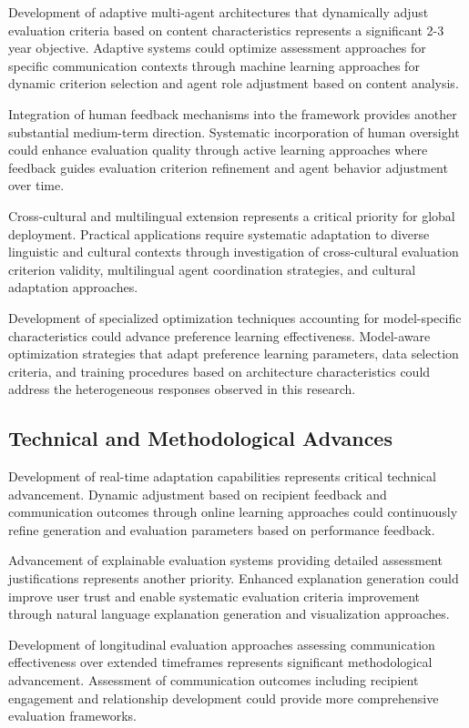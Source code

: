 Development of adaptive multi-agent architectures that dynamically adjust evaluation criteria based on content characteristics represents a significant 2-3 year objective. Adaptive systems could optimize assessment approaches for specific communication contexts through machine learning approaches for dynamic criterion selection and agent role adjustment based on content analysis.

Integration of human feedback mechanisms into the framework provides another substantial medium-term direction. Systematic incorporation of human oversight could enhance evaluation quality through active learning approaches where feedback guides evaluation criterion refinement and agent behavior adjustment over time.

Cross-cultural and multilingual extension represents a critical priority for global deployment. Practical applications require systematic adaptation to diverse linguistic and cultural contexts through investigation of cross-cultural evaluation criterion validity, multilingual agent coordination strategies, and cultural adaptation approaches.

Development of specialized optimization techniques accounting for model-specific characteristics could advance preference learning effectiveness. Model-aware optimization strategies that adapt preference learning parameters, data selection criteria, and training procedures based on architecture characteristics could address the heterogeneous responses observed in this research.

\subsection{Technical and Methodological Advances}

Development of real-time adaptation capabilities represents critical technical advancement. Dynamic adjustment based on recipient feedback and communication outcomes through online learning approaches could continuously refine generation and evaluation parameters based on performance feedback.

Advancement of explainable evaluation systems providing detailed assessment justifications represents another priority. Enhanced explanation generation could improve user trust and enable systematic evaluation criteria improvement through natural language explanation generation and visualization approaches.

Development of longitudinal evaluation approaches assessing communication effectiveness over extended timeframes represents significant methodological advancement. Assessment of communication outcomes including recipient engagement and relationship development could provide more comprehensive evaluation frameworks.

